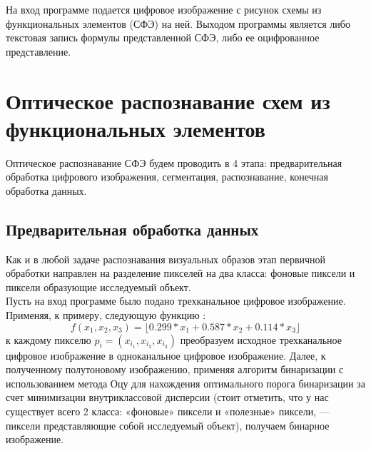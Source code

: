 \documentclass[makeidx, a4paper, 14pt]{extarticle}
\begin{document}
На вход программе подается цифровое изображение с рисунок схемы из функциональных элементов (СФЭ) на ней. Выходом программы является либо текстовая
запись формулы представленной СФЭ, либо ее оцифрованное представление.

\section{Оптическое распознавание схем из функциональных элементов}

Оптическое распознавание СФЭ будем проводить в 4 этапа: предварительная обработка цифрового изображения, сегментация, распознавание, конечная обработка данных.

\subsection{Предварительная обработка данных}

Как и в любой задаче распознавания визуальных образов этап первичной обработки направлен на разделение пикселей на два класса: фоновые пиксели и
пиксели образующие исследуемый объект. \\

Пусть на вход программе было подано трехканальное цифровое изображение. Применяя, к примеру, следующую функцию \cite{grayscale_luma}:
\[ f(x_1, x_2, x_3) = \lfloor 0.299 * x_1 + 0.587 * x_2 + 0.114 * x_3 \rfloor \] к каждому пикселю
$p_i=({x_{i_1}}, {x_{i_2}}, {x_{i_3}})$ преобразуем исходное трехканальное цифровое изображение в одноканальное цифровое изображение.
Далее, к полученному полутоновому изображению, применяя алгоритм бинаризации с использованием метода Оцу \cite{otsu79} для нахождения оптимального порога бинаризации за счет
минимизации внутриклассовой дисперсии (стоит отметить, что у нас существует всего 2 класса: «фоновые» пиксели и «полезные» пиксели, --- пиксели представляющие собой исследуемый объект),
получаем бинарное изображение.
\end{document}
